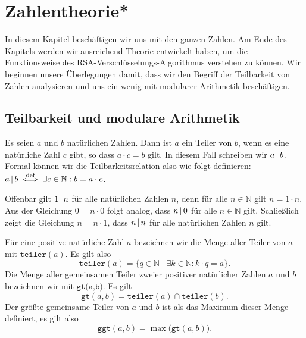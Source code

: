 \chapter{Zahlentheorie*}
In diesem Kapitel beschäftigen wir uns mit den ganzen Zahlen.  Am Ende des Kapitels werden
wir ausreichend Theorie entwickelt haben, um die Funktionsweise des
RSA-Verschlüsselungs-Algorithmus verstehen zu können.  
Wir beginnen unsere Überlegungen damit, dass wir den Begriff der Teilbarkeit von Zahlen
analysieren und uns ein wenig mit modularer Arithmetik beschäftigen.

\section{Teilbarkeit und modulare Arithmetik}

\begin{Definition}[Teiler]
  Es seien $a$ und $b$ natürlichen Zahlen.  Dann ist $a$ ein Teiler von $b$, wenn es eine
  natürliche Zahl $c$ gibt, so dass $a \cdot c = b$ gilt.  In diesem Fall schreiben wir $a \,|\, b$.
  Formal können wir die Teilbarkeitsrelation also wie folgt definieren:
  \\[0.2cm]
  \hspace*{1.3cm}
  $a \,|\, b \;\stackrel{\mbox{\scriptsize def}}{\Longleftrightarrow}\; \exists c \in \mathbb{N}: b = a \cdot c$.
\end{Definition}

\remark
Offenbar gilt $1 \,|\, n$ für alle natürlichen Zahlen $n$, denn für alle $n \in \mathbb{N}$ gilt 
$n = 1 \cdot n$.   Aus der Gleichung $0 = n \cdot 0$ folgt analog, dass $n \,|\, 0$ für alle 
$n \in \mathbb{N}$ gilt.  Schließlich zeigt die Gleichung $n = n \cdot 1$, dass $n \,|\, n$
für alle natürlichen Zahlen $n$ gilt.
\vspace*{0.3cm}

Für eine positive natürliche Zahl $a$ bezeichnen wir die Menge aller Teiler von $a$ mit
$\texttt{teiler}(a)$.  Es gilt also
\[ \texttt{teiler}(a) = \{ q \in \mathbb{N} \mid \exists k \in \mathbb{N}: k \cdot q = a \}. \]
Die Menge aller gemeinsamen Teiler zweier positiver natürlicher Zahlen
$a$ und $b$ bezeichnen wir mit $\texttt{gt(a,b)}$.  Es gilt
\[ \texttt{gt}(a,b) = \texttt{teiler}(a) \cap \texttt{teiler}(b). \]
Der größte gemeinsame Teiler von $a$ und $b$ ist als das Maximum dieser Menge definiert,
es gilt also 
\[ \texttt{ggt}(a,b) = \max\bigl(\texttt{gt}(a,b)\bigr). \]

